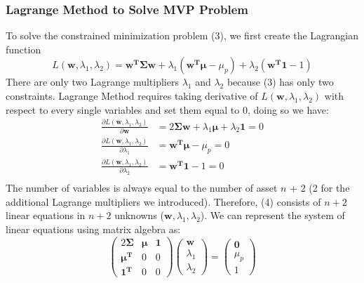 \documentclass[12pt,titlepage,letter]{article}
\begin{document}
		\subsubsection{Lagrange Method to Solve MVP Problem}

			To solve the constrained minimization problem (3), we first create the Lagrangian function 
			$$
				L(\mathbf{w}, \lambda_1, \lambda_2) = \mathbf{w^T\Sigma w} + \lambda_1(\mathbf{w^T}\pmb{\mu} - \mu_p) + \lambda_2(\mathbf{w^T1} - 1)
			$$
			There are only two Lagrange multipliers $\lambda_1$ and $\lambda_2$ because (3) has only two constraints. Lagrange Method requires taking derivative of $L(\mathbf{w}, \lambda_1, \lambda_2)$ with respect to every single variables and set them equal to 0, doing so we have: 
			\begin{equation}
				\begin{split}
					\frac{\partial L(\mathbf{w}, \lambda_1, \lambda_2)}{\partial \mathbf{w}} &= 2\mathbf{\Sigma w} + \lambda_1\pmb{\mu} + \lambda_2\mathbf{1} = 0 \\
					\frac{\partial L(\mathbf{w}, \lambda_1, \lambda_2)}{\partial \lambda_1} &=  \mathbf{w^T}\pmb{\mu} - \mu_p = 0\\
					\frac{\partial L(\mathbf{w}, \lambda_1, \lambda_2)}{\partial \lambda_2} &= \mathbf{w^T1} - 1 = 0\\
				\end{split}
			\end{equation}
			The number of variables is always equal to the number of asset $n$ + 2 (2 for the additional Lagrange multipliers we introduced). Therefore, (4) consists of $n+2$ linear equations in $n+2$ unknowns ($\mathbf{w}, \lambda_1, \lambda_2$). We can represent the system of linear equations using matrix algebra as: 
			\begin{equation*}
				\begin{pmatrix} 
					2\mathbf{\Sigma} & \pmb{\mu} & \mathbf{1} \\ \pmb{\mu^T} & 0 & 0 \\ \pmb{1^T} & 0 & 0 
				\end{pmatrix} 
				\begin{pmatrix}
					\mathbf{w} \\ \lambda_1 \\ \lambda_2
				\end{pmatrix}
				 = 
				\begin{pmatrix}
					\mathbf{0} \\ \mu_p \\ 1
				\end{pmatrix}
			\end{equation*}
\end{document}

